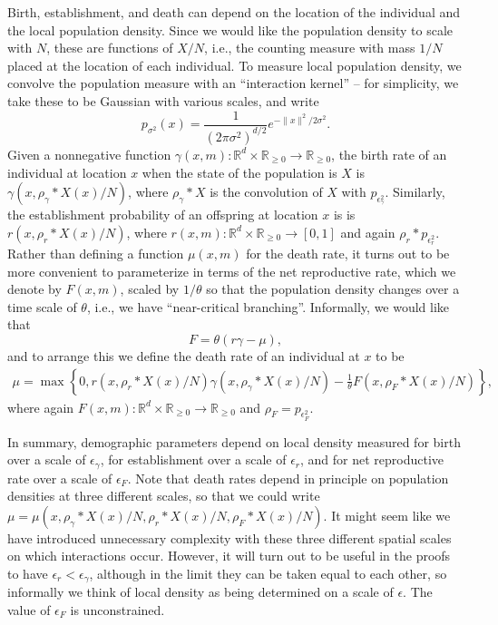 \documentclass[12pt]{article}
\newcommand{\IR}{\mathbb R}
\newcommand{\kernel}{\rho}  %
\newcommand{\smooth}[1]{\kernel_{#1} \! * \!}  %
\begin{document}
Birth, establishment, and death can depend on the location of the individual
and the local population density.
Since we would like the population density to scale with $N$,
these are functions of $X/N$, i.e.,
the counting measure with mass $1/N$ placed at the location of each individual.
To measure local population density, we convolve the population measure with
an ``interaction kernel'' -- for simplicity, we take these to be Gaussian
with various scales, and write
$$
    p_{\sigma^2}(x) = \frac{1}{(2 \pi \sigma^2)^{d/2}} e^{-\|x\|^2 / 2 \sigma^2} .
$$
Given a nonnegative function $\gamma(x, m) : \IR^d \times \IR_{\ge 0} \to \IR_{\ge 0}$,
the birth rate of an individual at location $x$ when the state of the population is $X$
is $\gamma(x, \smooth{\gamma} X(x) / N)$,
where $\smooth{\gamma} X$ is the convolution of $X$
with $p_{\epsilon_\gamma^2}$.
Similarly, the establishment probability of an offspring at location $x$ is
is $r(x, \smooth{r} X(x) / N)$,
where $r(x, m) : \IR^d \times \IR_{\ge 0} \to [0, 1]$
and again $\smooth{r} p_{\epsilon_r^2}$.
Rather than defining a function $\mu(x, m)$ for the death rate,
it turns out to be more convenient to parameterize in terms of the net reproductive rate,
which we denote by $F(x, m)$,
scaled by $1/\theta$
so that the population density changes over a time scale of $\theta$,
i.e., we have ``near-critical branching''.
Informally, we would like that
$$
    F = \theta (r \gamma - \mu) ,
$$
and to arrange this we define
the death rate of an individual at $x$ to be
\begin{align} \label{eqn:mu_defn}
    \mu
    =
    \max\left\{0, 
        r(x, \smooth{r} X(x) / N) \gamma(x, \smooth{\gamma} X(x) / N)
        - \frac{1}{\theta} F(x, \smooth{F} X(x) / N)
    \right\} ,
\end{align}
where again $F(x, m) : \IR^d \times \IR_{\ge 0} \to \IR_{\ge 0}$
and $\kernel_F = p_{\epsilon_F^2}$.

In summary, demographic parameters depend on local density measured
for birth over a scale of $\epsilon_\gamma$,
for establishment over a scale of $\epsilon_r$,
and for net reproductive rate over a scale of $\epsilon_F$.
Note that death rates depend in principle on population densities at three different scales,
so that we could write $\mu = \mu(x, \smooth{\gamma} X(x) / N, \smooth{r} X(x) / N, \smooth{F} X(x) / N)$.
It might seem like
we have introduced unnecessary complexity
with these three different spatial scales on which interactions occur.
However,
it will turn out to be useful in the proofs to have $\epsilon_r < \epsilon_\gamma$,
although in the limit they can be taken equal to each other,
so informally we think of local density as being determined on a scale of $\epsilon$.
The value of $\epsilon_F$ is unconstrained.
\end{document}
